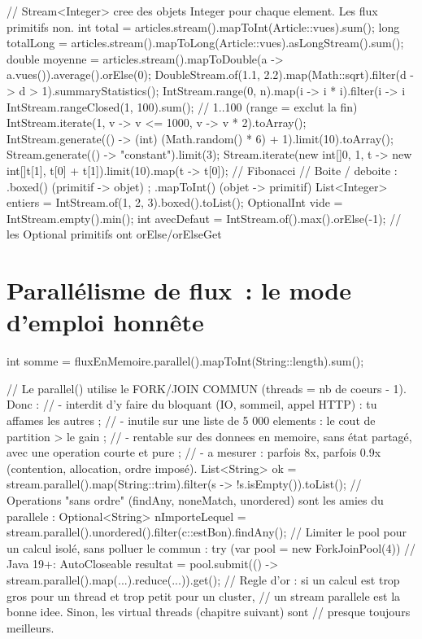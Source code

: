 \documentclass[12pt,a4paper,twoside,openright]{book}
\begin{document}
\begin{codejava}
// Stream<Integer> cree des objets Integer pour chaque element. Les flux primitifs non.
int total = articles.stream().mapToInt(Article::vues).sum();
long totalLong = articles.stream().mapToLong(Article::vues).asLongStream().sum();
double moyenne = articles.stream().mapToDouble(a -> a.vues()).average().orElse(0);
DoubleStream.of(1.1, 2.2).map(Math::sqrt).filter(d -> d > 1).summaryStatistics();
IntStream.range(0, n).map(i -> i * i).filter(i -> i %
IntStream.rangeClosed(1, 100).sum();                      // 1..100 (range = exclut la fin)
IntStream.iterate(1, v -> v <= 1000, v -> v * 2).toArray();
IntStream.generate(() -> (int) (Math.random() * 6) + 1).limit(10).toArray();
Stream.generate(() -> "constant").limit(3);
Stream.iterate(new int[]{0, 1}, t -> new int[]{t[1], t[0] + t[1]}).limit(10).map(t -> t[0]);  // Fibonacci
// Boite / deboite : .boxed() (primitif -> objet) ; .mapToInt() (objet -> primitif)
List<Integer> entiers = IntStream.of(1, 2, 3).boxed().toList();
OptionalInt vide = IntStream.empty().min();
int avecDefaut = IntStream.of().max().orElse(-1);        // les Optional primitifs ont orElse/orElseGet
\end{codejava}

\section{Parall\'elisme de flux~: le mode d'emploi honn\^ete}

\begin{codejava}
int somme = fluxEnMemoire.parallel().mapToInt(String::length).sum();

// Le parallel() utilise le FORK/JOIN COMMUN (threads = nb de coeurs - 1). Donc :
//  - interdit d'y faire du bloquant (IO, sommeil, appel HTTP) : tu affames les autres ;
//  - inutile sur une liste de 5 000 elements : le cout de partition > le gain ;
//  - rentable sur des donnees en memoire, sans \'etat partag\'e, avec une operation courte et pure ;
//  - a mesurer : parfois 8x, parfois 0.9x (contention, allocation, ordre impos\'e).
List<String> ok = stream.parallel().map(String::trim).filter(s -> !s.isEmpty()).toList();
// Operations "sans ordre" (findAny, noneMatch, unordered) sont les amies du parallele :
Optional<String> nImporteLequel = stream.parallel().unordered().filter(c::estBon).findAny();
// Limiter le pool pour un calcul isol\'e, sans polluer le commun :
try (var pool = new ForkJoinPool(4)) {                  // Java 19+: AutoCloseable
    resultat = pool.submit(() -> stream.parallel().map(...).reduce(...)).get();
}
// Regle d'or : si un calcul est trop gros pour un thread et trop petit pour un cluster,
// un stream parallele est la bonne idee. Sinon, les virtual threads (chapitre suivant) sont
// presque toujours meilleurs.
\end{codejava}
\end{document}
